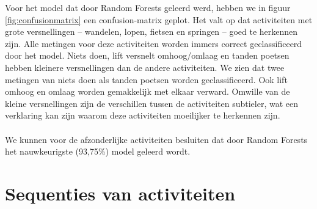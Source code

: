 \documentclass{article}
\begin{document}
Voor het model dat door Random Forests geleerd werd, hebben we in figuur \ref{fig:confusionmatrix} een confusion-matrix geplot. Het valt op dat activiteiten met grote versnellingen -- wandelen, lopen, fietsen en springen -- goed te herkennen zijn. Alle metingen voor deze activiteiten worden immers correct geclassificeerd door het model. Niets doen, lift versnelt omhoog/omlaag en tanden poetsen hebben kleinere versnellingen dan de andere activiteiten. We zien dat twee metingen van niets doen als tanden poetsen worden geclassificeerd. Ook lift omhoog en omlaag worden gemakkelijk met elkaar verward. Omwille van de kleine versnellingen zijn de verschillen tussen de activiteiten subtieler, wat een verklaring kan zijn waarom deze activiteiten moeilijker te herkennen zijn.
\\~\\
We kunnen voor de afzonderlijke activiteiten besluiten dat door Random Forests het nauwkeurigste (93,75\%) model geleerd wordt.


\section{Sequenties van activiteiten}
\end{document}
